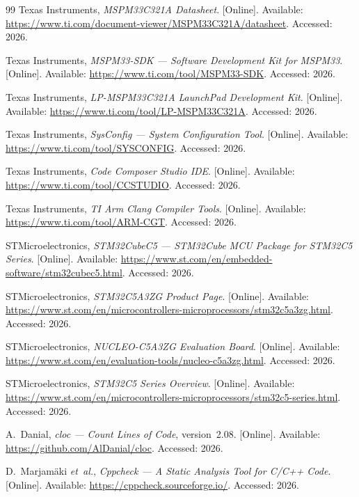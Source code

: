 \documentclass[12pt,a4paper,oneside]{book}
\begin{document}
\begin{thebibliography}{99}
Texas Instruments, \emph{MSPM33C321A Datasheet}. [Online]. Available: \url{https://www.ti.com/document-viewer/MSPM33C321A/datasheet}. Accessed: 2026.

Texas Instruments, \emph{MSPM33-SDK --- Software Development Kit for MSPM33}. [Online]. Available: \url{https://www.ti.com/tool/MSPM33-SDK}. Accessed: 2026.

Texas Instruments, \emph{LP-MSPM33C321A LaunchPad Development Kit}. [Online]. Available: \url{https://www.ti.com/tool/LP-MSPM33C321A}. Accessed: 2026.

Texas Instruments, \emph{SysConfig --- System Configuration Tool}. [Online]. Available: \url{https://www.ti.com/tool/SYSCONFIG}. Accessed: 2026.

Texas Instruments, \emph{Code Composer Studio IDE}. [Online]. Available: \url{https://www.ti.com/tool/CCSTUDIO}. Accessed: 2026.

Texas Instruments, \emph{TI Arm Clang Compiler Tools}. [Online]. Available: \url{https://www.ti.com/tool/ARM-CGT}. Accessed: 2026.

STMicroelectronics, \emph{STM32CubeC5 --- STM32Cube MCU Package for STM32C5 Series}. [Online]. Available: \url{https://www.st.com/en/embedded-software/stm32cubec5.html}. Accessed: 2026.

STMicroelectronics, \emph{STM32C5A3ZG Product Page}. [Online]. Available: \url{https://www.st.com/en/microcontrollers-microprocessors/stm32c5a3zg.html}. Accessed: 2026.

STMicroelectronics, \emph{NUCLEO-C5A3ZG Evaluation Board}. [Online]. Available: \url{https://www.st.com/en/evaluation-tools/nucleo-c5a3zg.html}. Accessed: 2026.

STMicroelectronics, \emph{STM32C5 Series Overview}. [Online]. Available: \url{https://www.st.com/en/microcontrollers-microprocessors/stm32c5-series.html}. Accessed: 2026.

A.~Danial, \emph{cloc --- Count Lines of Code}, version~2.08. [Online]. Available: \url{https://github.com/AlDanial/cloc}. Accessed: 2026.

D.~Marjam\"{a}ki \emph{et~al.}, \emph{Cppcheck --- A Static Analysis Tool for C/C++ Code}. [Online]. Available: \url{https://cppcheck.sourceforge.io/}. Accessed: 2026.


\end{thebibliography}
\end{document}
